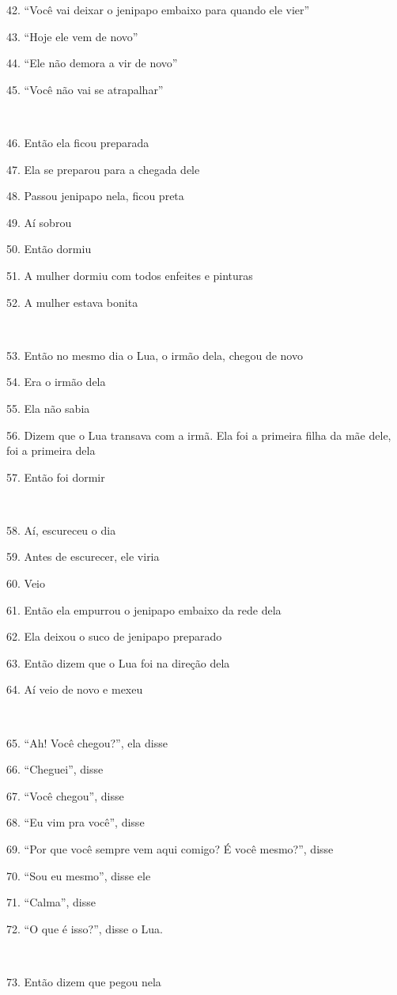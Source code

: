 42. ``Você vai deixar o jenipapo embaixo para quando ele vier''

43. ``Hoje ele vem de novo''

44. ``Ele não demora a vir de novo''

45. ``Você não vai se atrapalhar''

~

46. Então ela ficou preparada

47. Ela se preparou para a chegada dele

48. Passou jenipapo nela, ficou preta

49. Aí sobrou

50. Então dormiu

51. A mulher dormiu com todos enfeites e pinturas

52. A mulher estava bonita

~

53. Então no mesmo dia o Lua, o irmão dela, chegou de novo

54. Era o irmão dela

55. Ela não sabia

56. Dizem que o Lua transava com a irmã. Ela foi a primeira filha da mãe
dele, foi a primeira dela

57. Então foi dormir

~

58. Aí, escureceu o dia

59. Antes de escurecer, ele viria

60. Veio

61. Então ela empurrou o jenipapo embaixo da rede dela

62. Ela deixou o suco de jenipapo preparado

63. Então dizem que o Lua foi na direção dela

64. Aí veio de novo e mexeu

~

65. ``Ah! Você chegou?'', ela disse

66. ``Cheguei'', disse

67. ``Você chegou'', disse

68. ``Eu vim pra você'', disse

69. ``Por que você sempre vem aqui comigo? É você mesmo?'', disse

70. ``Sou eu mesmo'', disse ele

71. ``Calma'', disse

72. ``O que é isso?'', disse o Lua.

~

73. Então dizem que pegou nela

